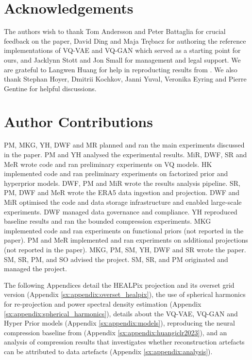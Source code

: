 \documentclass[11pt, a4paper, logo, copyright, numbering]{googledeepmind}
\begin{document}
%
 
\newpage
\section*{Acknowledgements}
The authors wish to thank Tom Andersson and Peter Battaglia for crucial feedback on the paper, David Ding and Maja Trębacz for authoring the reference implementations of VQ-VAE and VQ-GAN which served as a starting point for ours, and Jacklynn Stott and Jon Small for management and legal support. We are grateful to Langwen Huang for help in reproducting results from \citep{huang2022compressing}. We also thank Stephan Hoyer, Dmitrii Kochkov, Janni Yuval, Veronika Eyring and Pierre Gentine for helpful discussions.


\section*{Author Contributions}
PM, MKG, YH, DWF and MR planned and ran the main experiments discussed in the paper.
PM and YH analysed the experimental results.
MiR, DWF, SR and MeR wrote code and ran preliminary experiments on VQ models.
HK implemented code and ran preliminary experiments on factorized prior and hyperprior models.
DWF, PM and MiR wrote the results analysis pipeline.
SR, PM, DWF and MeR wrote the ERA5 data ingestion and projection.
DWF and MiR optimised the code and data storage infrastructure and enabled large-scale experiments.
DWF managed data governance and compliance.
YH reproduced baseline results and ran the bounded compression experiments.
MKG implemented code and ran experiments on functional priors (not reported in the paper).
PM and MeR implemented and ran experiments on additional projections (not reported in the paper).
MKG, PM, SM, YH, DWF and SR wrote the paper.
SM, SR, PM, and SO advised the project. 
SM, SR, and PM originated and managed the project.


\newpage


\newpage
\appendix
\appendixpage



The following Appendices detail the HEALPix projection and its overset grid version (Appendix \ref{sx:appendix:overset_healpix}), the use of spherical harmonics for re-projection and power spectral density estimation (Appendix \ref{sx:appendix:spherical_harmonics}), details about the VQ-VAE, VQ-GAN and Hyper Prior models (Appendix \ref{sx:appendix:models}), reproducing the neural compression baseline from \citep{huang2022compressing} (Appendix \ref{sx:appendix:huangiclr2023}), and an analysis of compression results that investigates whether reconstruction artefacts can be attributed to data artefacts (Appendix \ref{sx:appendix:analysis}).
\end{document}
